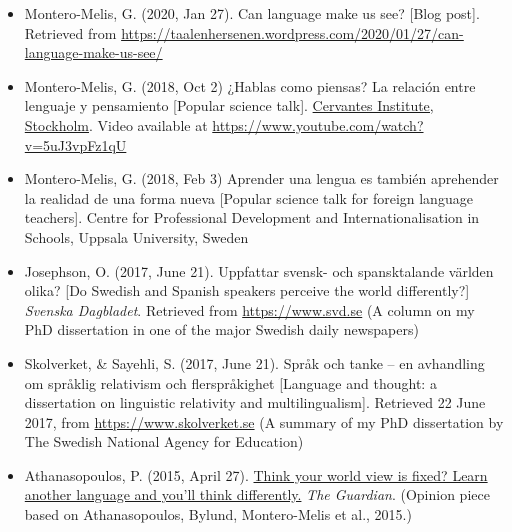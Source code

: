 \documentclass[margin, 11pt]{res} %
\begin{document}
\begin{resume}
\begin{itemize}
\item Montero-Melis, G. (2020, Jan 27). Can language make us see? [Blog post]. Retrieved from \url{https://taalenhersenen.wordpress.com/2020/01/27/can-language-make-us-see/}

\item Montero-Melis, G. (2018, Oct 2) ¿Hablas como piensas? La relación entre lenguaje y pensamiento [Popular science talk].  \href{https://cultura.cervantes.es/estocolmo/es/-hablas-como-piensas--la-relacion-entre-el-lenguaje-y-el-pensamiento/122695}{Cervantes Institute, Stockholm}.
Video available at \url{https://www.youtube.com/watch?v=5uJ3vpFz1qU}

\item Montero-Melis, G. (2018, Feb 3) Aprender una lengua es también aprehender la realidad de una forma nueva [Popular science talk for foreign language teachers]. Centre for Professional Development and Internationalisation in Schools, Uppsala University, Sweden

\item Josephson, O. (2017, June 21). Uppfattar svensk- och spansktalande v{\"a}rlden olika? [Do Swedish and Spanish speakers perceive the world differently?] \emph{Svenska Dagbladet}. Retrieved from \url{https://www.svd.se} (A column on my PhD dissertation in one of the major Swedish daily newspapers)

\item Skolverket, \& Sayehli, S. (2017, June 21). Spr{\aa}k och tanke -- en avhandling om spr{\aa}klig relativism och flerspr{\aa}kighet [Language and thought: a dissertation on linguistic relativity and multilingualism]. Retrieved 22 June 2017, from \url{https://www.skolverket.se} (A summary of my PhD dissertation by The Swedish National Agency for Education)

\item Athanasopoulos, P. (2015, April 27). \href{https://www.theguardian.com/commentisfree/2015/apr/27/world-view-learn-another-language}{Think your world view is fixed? Learn another language and you'll think differently.} \emph{The Guardian}. (Opinion piece based on Athanasopoulos, Bylund, Montero-Melis et al., 2015.)

\end{itemize}


 

\end{resume}
\end{document}
